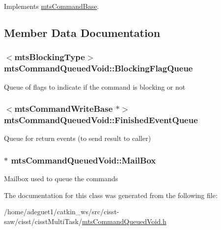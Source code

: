 Implements \hyperlink{classmts_command_base_a0885ce7a5321d7b672694ade780b9d64}{mts\-Command\-Base}.



\subsection{Member Data Documentation}
\hypertarget{classmts_command_queued_void_aefa9eea10dadece42a79902c0e3dc50f}{
\subsubsection[{Blocking\-Flag\-Queue}]{$<${\bf mts\-Blocking\-Type}$>$ mts\-Command\-Queued\-Void\-::\-Blocking\-Flag\-Queue\hspace{0.3cm}{\ttfamily [protected]}}}\label{classmts_command_queued_void_aefa9eea10dadece42a79902c0e3dc50f}
Queue of flags to indicate if the command is blocking or not \hypertarget{classmts_command_queued_void_a292d6fd53236a3143e1182f248d1621d}{
\subsubsection[{Finished\-Event\-Queue}]{$<${\bf mts\-Command\-Write\-Base} $\ast$$>$ mts\-Command\-Queued\-Void\-::\-Finished\-Event\-Queue\hspace{0.3cm}{\ttfamily [protected]}}}\label{classmts_command_queued_void_a292d6fd53236a3143e1182f248d1621d}
Queue for return events (to send result to caller) \hypertarget{classmts_command_queued_void_a44473994b2785131ab7c0f9974858ff0}{
\subsubsection[{Mail\-Box}]{$\ast$ mts\-Command\-Queued\-Void\-::\-Mail\-Box\hspace{0.3cm}{\ttfamily [protected]}}}\label{classmts_command_queued_void_a44473994b2785131ab7c0f9974858ff0}
Mailbox used to queue the commands 

The documentation for this class was generated from the following file\-:\begin{DoxyCompactItemize}
\item 
/home/adeguet1/catkin\-\_\-ws/src/cisst-\/saw/cisst/cisst\-Multi\-Task/\hyperlink{mts_command_queued_void_8h}{mts\-Command\-Queued\-Void.\-h}\end{DoxyCompactItemize}
